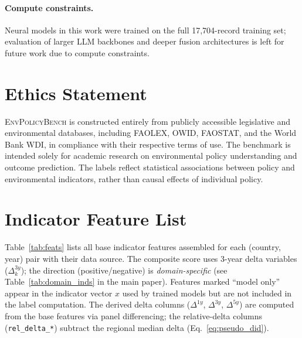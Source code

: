 \documentclass[11pt]{article}
\newcommand{\bench}{\textsc{EnvPolicyBench}}
\begin{document}
\paragraph{Compute constraints.}
Neural models in this work were trained on the full 17{,}704-record training set; evaluation of larger LLM backbones and deeper fusion architectures is left for future work due to compute constraints.

\section*{Ethics Statement}
\bench{} is constructed entirely from publicly accessible legislative and environmental databases, including FAOLEX, OWID, FAOSTAT, and the World Bank WDI, in compliance with their respective terms of use. The benchmark is intended solely for academic research on environmental policy understanding and outcome prediction. The labels reflect statistical associations between policy and environmental indicators, rather than causal effects of individual policy. 








\appendix

\section{Indicator Feature List}
\label{app:feats}

Table~\ref{tab:feats} lists all base indicator features assembled for each
(country, year) pair with their data source. The composite score uses 3-year
delta variables ($\Delta^{3y}_k$); the direction (positive/negative) is
\emph{domain-specific} (see Table~\ref{tab:domain_inds} in the main paper).
Features marked ``model only'' appear in the indicator vector $x$ used by
trained models but are not included in the label computation.
The derived delta columns ($\Delta^{1y}$, $\Delta^{3y}$, $\Delta^{5y}$) are
computed from the base features via panel differencing; the relative-delta
columns (\texttt{rel\_delta\_*}) subtract the regional median delta
(Eq.~\ref{eq:pseudo_did}).
\end{document}

